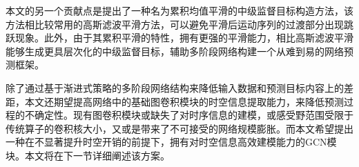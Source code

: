 本文的另一个贡献点是提出了一种名为累积均值平滑的中级监督目标构造方法，该方法相比较常用的高斯滤波平滑方法，可以避免平滑后运动序列的过渡部分出现跳跃现象。此外，由于其累积平滑的特性，拥有更强的平滑能力，相比高斯滤波平滑能够生成更具层次化的中级监督目标，辅助多阶段网络构建一个从难到易的网络预测框架。

除了通过基于渐进式策略的多阶段网络结构来降低输入数据和预测目标内容上的差距，本文还期望提高网络中的基础图卷积模块的时空信息提取能力，来降低预测过程的不确定性。现有图卷积模块或缺失了对时序信息的建模，或感受野范围受限于传统算子的卷积核大小，又或是带来了不可接受的网络规模膨胀。而本文希望提出一种在不显著提升时空开销的前提下，拥有对时空信息高效建模能力的GCN模块。本文将在下一节详细阐述该方案。